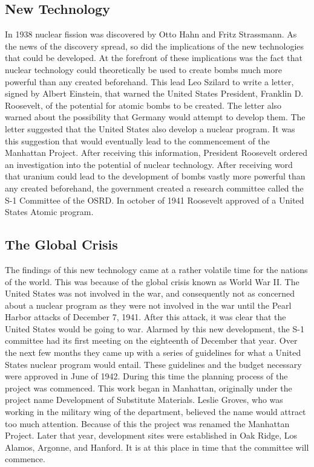 \documentclass[11 pt, twoside]{article}
\begin{document}
\subsection{New Technology}
	In 1938 nuclear fission was discovered by Otto Hahn and Fritz Strassmann. As the news of the discovery spread, so did the implications of the new technologies that could be developed. At the forefront of these implications was the fact that nuclear technology could theoretically be used to create bombs much more powerful than any created beforehand. This lead Leo Szilard to write a letter, signed by Albert Einstein, that warned the United States President, Franklin D. Roosevelt, of the potential for atomic bombs to be created. The letter also warned about the possibility that Germany would attempt to develop them. The letter suggested that the United States also develop a nuclear program. It was this suggestion that would eventually lead to the commencement of the Manhattan Project. After receiving this information, President Roosevelt ordered an investigation into the potential of nuclear technology. After receiving word that uranium could lead to the development of bombs vastly more powerful than any created beforehand, the government created a research committee called the S-1 Committee of the OSRD. In october of 1941 Roosevelt approved of a United States Atomic program.
\subsection{The Global Crisis}
	The findings of this new technology came at a rather volatile time for the nations of the world. This was because of the global crisis known as World War II. The United States was not involved in the war, and consequently not as concerned about a nuclear program as they were not involved in the war until the Pearl Harbor attacks of December 7, 1941. After this attack, it was clear that the United States would be going to war. Alarmed by this new development, the S-1 committee had its first meeting on the eighteenth of December that year. Over the next few months they came up with a series of guidelines for what a United States nuclear program would entail. These guidelines and the budget necessary were approved in June of 1942. During this time the planning process of the project was commenced. This work began in Manhattan, originally under the project name Development of Substitute Materials. Leslie Groves, who was working in the military wing of the department, believed the name would attract too much attention. Because of this the project was renamed the Manhattan Project. Later that year, development sites were established in Oak Ridge, Los Alamos, Argonne, and Hanford. It is at this place in time that the committee will commence. 
\end{document}

